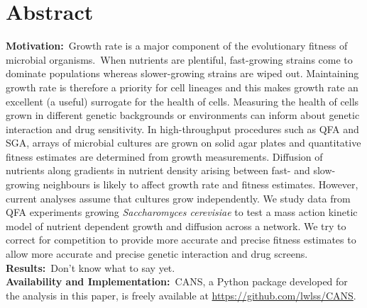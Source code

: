 \section*{Abstract}
\label{sec:abstract}

\textbf{Motivation:}~Growth rate is a major component of the
evolutionary fitness of microbial organisms.~When nutrients are
plentiful, fast-growing strains come to dominate populations whereas
slower-growing strains are wiped out. Maintaining growth rate is
therefore a priority for cell lineages and this makes growth rate an
excellent (a useful) surrogate for the health of cells. Measuring the
health of cells grown in different genetic backgrounds or environments
can inform about genetic interaction and drug sensitivity. In
high-throughput procedures such as QFA and SGA, arrays of microbial
cultures are grown on solid agar plates and quantitative fitness
estimates are determined from growth measurements. Diffusion of
nutrients along gradients in nutrient density arising between fast-
and slow-growing neighbours is likely to affect growth rate and
fitness estimates. However, current analyses assume that cultures grow
independently. We study data from QFA experiments growing
\textit{Saccharomyces cerevisiae} to test a mass action kinetic model
of nutrient dependent growth and diffusion across a network. We try to
correct for competition to provide more accurate and precise fitness
estimates to allow more accurate and precise genetic interaction and
drug screens.
\\
\textbf{Results:}~Don't know what to say yet.\\
\textbf{Availability and Implementation:}~CANS, a Python package
developed for the analysis in this paper, is freely available at
\href{https://github.com/lwlss/CANS}{https://github.com/lwlss/CANS}.
